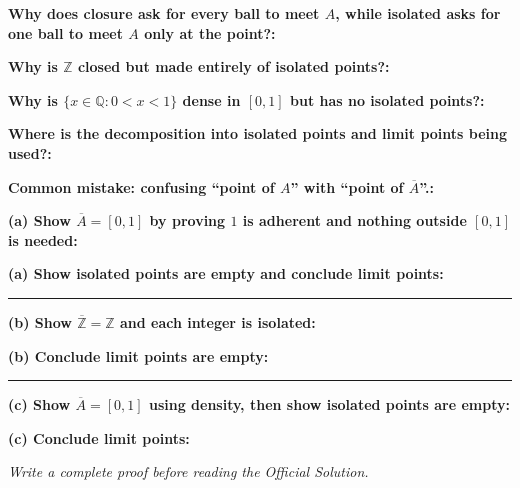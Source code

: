 \documentclass[12pt]{article}
\newcommand{\fillfield}[1]{%
  \par\noindent\textbf{#1:}\enspace\hrulefill\par\vspace{3pt}%
}
\newcommand{\writespace}[1]{\vspace{#1}}
\begin{document}
\bigskip

\begin{tcolorbox}[
  enhanced, breakable,
  colback  = pass3orange,
  colframe = orange!65!black,
  fonttitle = \bfseries,
  title = {Pass 3 \enspace\textbf{--}\enspace Self-Explanation}
]
\fillfield{Why does closure ask for every ball to meet $A$, while isolated asks for one ball to meet $A$ only at the point?}
\fillfield{Why is $\mathbb{Z}$ closed but made entirely of isolated points?}
\fillfield{Why is $\{x\in\mathbb{Q}:0<x<1\}$ dense in $[0,1]$ but has no isolated points?}
\fillfield{Where is the decomposition into isolated points and limit points being used?}
\fillfield{Common mistake: confusing ``point of $A$'' with ``point of $\overline{A}$''.}
\end{tcolorbox}

\newpage

\begin{tcolorbox}[
  enhanced, breakable,
  colback  = pass4purple,
  colframe = purple!55!black,
  fonttitle = \bfseries,
  title = {Pass 4 \enspace\textbf{--}\enspace Skeleton Proof}
]
\noindent\textbf{(a) Show $\overline{A}=[0,1]$ by proving $1$ is adherent and nothing outside $[0,1]$ is needed:}\par
\writespace{1.8cm}
\noindent\textbf{(a) Show isolated points are empty and conclude limit points:}\par
\writespace{1.4cm}

\noindent\rule{\linewidth}{0.4pt}\vspace{2pt}

\noindent\textbf{(b) Show $\overline{\mathbb{Z}}=\mathbb{Z}$ and each integer is isolated:}\par
\writespace{1.8cm}
\noindent\textbf{(b) Conclude limit points are empty:}\par
\writespace{0.8cm}

\noindent\rule{\linewidth}{0.4pt}\vspace{2pt}

\noindent\textbf{(c) Show $\overline{A}=[0,1]$ using density, then show isolated points are empty:}\par
\writespace{1.8cm}
\noindent\textbf{(c) Conclude limit points:}\par
\writespace{0.8cm}
\end{tcolorbox}

\newpage

\begin{tcolorbox}[
  enhanced, breakable,
  colback  = pass5gray,
  colframe = black!38,
  fonttitle = \bfseries,
  title = {Pass 5 \enspace\textbf{--}\enspace Full Proof Attempt}
]
\small\itshape Write a complete proof before reading the Official Solution.\par
\normalfont\normalsize
\writespace{19cm}
\end{tcolorbox}
\end{document}
